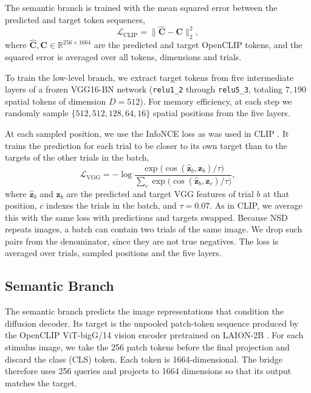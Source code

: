 \documentclass[letterpaper]{article} %
\begin{document}
The semantic branch is trained with the mean squared error between the predicted and target token sequences,
\begin{equation}
\mathcal{L}_{\mathrm{CLIP}} = \big\lVert \hat{\mathbf{C}} - \mathbf{C} \big\rVert_2^2,
\end{equation}
where $\hat{\mathbf{C}}, \mathbf{C} \in \mathbb{R}^{256 \times 1664}$ are the predicted and target OpenCLIP tokens, and the squared error is averaged over all tokens, dimensions and trials.

To train the low-level branch, we extract target tokens from five intermediate layers of a frozen VGG16-BN network (\texttt{relu1\_2} through \texttt{relu5\_3}, totaling $7{,}190$ spatial tokens of dimension $D=512$). For memory efficiency, at each step we randomly sample $\{512, 512, 128, 64, 16\}$ spatial positions from the five layers.

At each sampled position, we use the InfoNCE loss \cite{oord2019representationlearningcontrastivepredictive} as was used in CLIP \cite{radford2021learningtransferablevisualmodels}. It trains the prediction for each trial to be closer to its own target than to the targets of the other trials in the batch,
\begin{equation}
\mathcal{L}_{\mathrm{VGG}} = -\log \frac{\exp\big(\cos(\hat{\mathbf{z}}_b, \mathbf{z}_b)/\tau\big)}{\sum_{c} \exp\big(\cos(\hat{\mathbf{z}}_b, \mathbf{z}_c)/\tau\big)},
\end{equation}
where $\hat{\mathbf{z}}_b$ and $\mathbf{z}_b$ are the predicted and target VGG features of trial $b$ at that position, $c$ indexes the trials in the batch, and $\tau = 0.07$. As in CLIP, we average this with the same loss with predictions and targets swapped. Because NSD repeats images, a batch can contain two trials of the same image. We drop such pairs from the denominator, since they are not true negatives. The loss is averaged over trials, sampled positions and the five layers.

\subsection{Semantic Branch}
\label{sec:semantic}
The semantic branch predicts the image representations that condition the diffusion decoder. Its target is the unpooled patch-token sequence produced by the OpenCLIP ViT-bigG/14 vision encoder pretrained on LAION-2B \cite{schuhmann2022laionb}. For each stimulus image, we take the 256 patch tokens before the final projection and discard the class (CLS) token. Each token is 1664-dimensional. The bridge therefore uses 256 queries and projects to 1664 dimensions so that its output matches the target.
\end{document}
